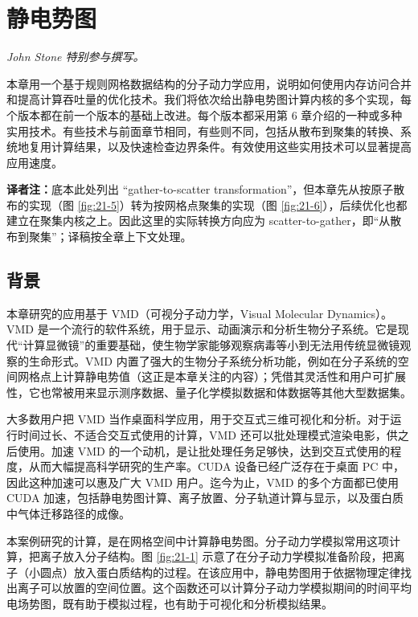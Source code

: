 \chapter{静电势图}
\label{chap:electrostatic-potential-map}
\chaptercontents

\setcounter{footnote}{0}

\noindent\textit{John Stone 特别参与撰写。}

本章用一个基于规则网格数据结构的分子动力学应用，说明如何使用内存访问合并和提高计算吞吐量的优化技术。我们将依次给出静电势图计算内核的多个实现，每个版本都在前一个版本的基础上改进。每个版本都采用第 6 章介绍的一种或多种实用技术。有些技术与前面章节相同，有些则不同，包括从散布到聚集的转换、系统地复用计算结果，以及快速检查边界条件。有效使用这些实用技术可以显著提高应用速度。

\noindent\textbf{译者注：}底本此处列出 ``gather-to-scatter transformation''，但本章先从按原子散布的实现（图 \ref{fig:21-5}）转为按网格点聚集的实现（图 \ref{fig:21-6}），后续优化也都建立在聚集内核之上。因此这里的实际转换方向应为 scatter-to-gather，即“从散布到聚集”；译稿按全章上下文处理。

\section{背景}
\label{sec:electrostatic-background}

本章研究的应用基于 VMD（可视分子动力学，Visual Molecular Dynamics）\cite{ch21-humphrey1996vmd}。VMD 是一个流行的软件系统，用于显示、动画演示和分析生物分子系统。它是现代“计算显微镜”的重要基础，使生物学家能够观察病毒等小到无法用传统显微镜观察的生命形式。VMD 内置了强大的生物分子系统分析功能，例如在分子系统的空间网格点上计算静电势值（这正是本章关注的内容）；凭借其灵活性和用户可扩展性，它也常被用来显示测序数据、量子化学模拟数据和体数据等其他大型数据集。

大多数用户把 VMD 当作桌面科学应用，用于交互式三维可视化和分析。对于运行时间过长、不适合交互式使用的计算，VMD 还可以批处理模式渲染电影，供之后使用。加速 VMD 的一个动机，是让批处理任务足够快，达到交互式使用的程度，从而大幅提高科学研究的生产率。CUDA 设备已经广泛存在于桌面 PC 中，因此这种加速可以惠及广大 VMD 用户。迄今为止，VMD 的多个方面都已使用 CUDA 加速，包括静电势图计算、离子放置、分子轨道计算与显示，以及蛋白质中气体迁移路径的成像。

本案例研究的计算，是在网格空间中计算静电势图。分子动力学模拟常用这项计算，把离子放入分子结构。图 \ref{fig:21-1} 示意了在分子动力学模拟准备阶段，把离子（小圆点）放入蛋白质结构的过程。在该应用中，静电势图用于依据物理定律找出离子可以放置的空间位置。这个函数还可以计算分子动力学模拟期间的时间平均电场势图，既有助于模拟过程，也有助于可视化和分析模拟结果。


